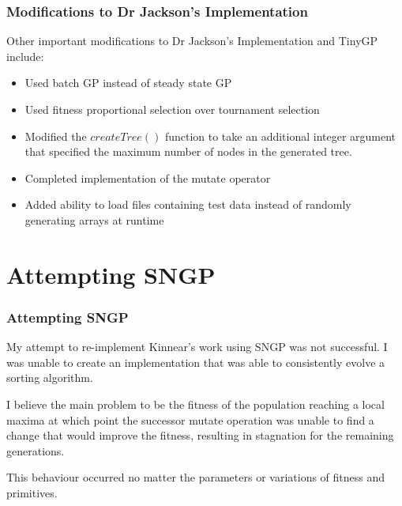 \documentclass{beamer}
\begin{document}
		\begin{frame}
		
			\frametitle{Modifications to Dr Jackson's Implementation}
			
			Other important modifications to Dr Jackson's Implementation and TinyGP include:
			
			\begin{itemize}
				\pause
				\item Used batch GP instead of steady state GP
				\pause
				\item Used fitness proportional selection over tournament selection
				\pause
				\item Modified the $createTree()$ function to take an additional integer argument that specified the maximum number of nodes in the generated tree.
				\pause
				\item Completed implementation of the mutate operator
				\pause
				\item Added ability to load files containing test data instead of randomly generating arrays at runtime
			\end{itemize}
		
		\end{frame}
	
	\section{Attempting SNGP}
	
		\begin{frame}
		
			\frametitle{Attempting SNGP}
			
			My attempt to re-implement Kinnear's work using SNGP was not successful. I was unable to create an implementation that was able to consistently evolve a sorting algorithm.
			
			I believe the main problem to be the fitness of the population reaching a local maxima at which point the successor mutate operation was unable to find a change that would improve the fitness, resulting in stagnation for the remaining generations. 
			
			This behaviour occurred no matter the parameters or variations of fitness and primitives.
			
			
			
		\end{frame}
	
\end{document}
